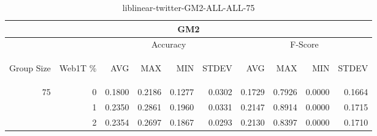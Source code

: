 \begin{center}
\begin{table}[htbp] 
 \begin{center}
\begin{tabular}{ | r | r | r | r | r | r | r | r | r | r |}
\hline
\multicolumn{10}{|c|}{GM2}\\
\hline
 & & \multicolumn{4}{|c|}{Accuracy} & \multicolumn{4}{|c|}{F-Score}\\ \cline{3-10}
\begin{sideways}Group Size\end{sideways} & \begin{sideways}Web1T \%\end{sideways} & \begin{sideways}AVG\end{sideways} & \begin{sideways}MAX\end{sideways} & \begin{sideways}MIN\end{sideways} & \begin{sideways}STDEV\end{sideways} & \begin{sideways}AVG\end{sideways} & \begin{sideways}MAX\end{sideways} & \begin{sideways}MIN\end{sideways} & \begin{sideways}STDEV\end{sideways}\\
\hline
\multirow{2}{*}{75}
 & 0 & 0.1800 & 0.2186 & 0.1277 & 0.0302 & 0.1729 & 0.7926 & 0.0000 & 0.1664\\ \cline{2-10}
 & 1 & 0.2350 & 0.2861 & 0.1960 & 0.0331 & 0.2147 & 0.8914 & 0.0000 & 0.1715\\ \cline{2-10}
 & 2 & 0.2354 & 0.2697 & 0.1867 & 0.0293 & 0.2130 & 0.8397 & 0.0000 & 0.1710\\ \cline{2-10}
\hline
\end{tabular}
\caption{liblinear-twitter-GM2-ALL-ALL-75}
\label{table:liblinear-twitter-GM2-ALL-ALL-75}
\end{center}
 \end{table}
\end{center}

